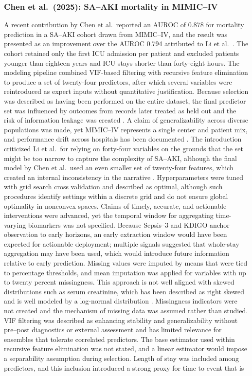\subsubsection{Chen et al.\ (2025): SA--AKI mortality in MIMIC--IV}
A recent contribution by Chen et al.\ reported an AUROC of 0.878 for mortality prediction in a SA--AKI cohort drawn from MIMIC--IV, and the result was presented as an improvement over the AUROC 0.794 attributed to Li et al.\ \citep{Chen_2025,Li_2023_SciRep}. The cohort retained only the first ICU admission per patient and excluded patients younger than eighteen years and ICU stays shorter than forty-eight hours. The modeling pipeline combined VIF-based filtering with recursive feature elimination to produce a set of twenty-four predictors, after which several variables were reintroduced as expert inputs without quantitative justification. Because selection was described as having been performed on the entire dataset, the final predictor set was influenced by outcomes from records later treated as held out and the risk of information leakage was created \citep{Kang_Yoon_2023}. A claim of generalizability across diverse populations was made, yet MIMIC--IV represents a single center and patient mix, and performance drift across hospitals has been documented \citep{Johnson_2023_MIMIC,Rockenschaub_2024}. The introduction criticized Li et al.\ for relying on forty-four variables on the grounds that the set might be too narrow to capture the complexity of SA--AKI, although the final model by Chen et al.\ used an even smaller set of twenty-four features, which created an internal inconsistency in the narrative \citep{Chen_2025,Li_2023_SciRep}. Hyperparameters were tuned with grid search cross validation and described as optimal, although such procedures identify settings within a discrete grid and do not ensure global optimality in nonconvex spaces. Claims of timely, accurate, and actionable interventions were advanced, yet the temporal window for aggregating time-varying biomarkers was not specified. Because Sepsis--3 and KDIGO anchor observation to early horizons, an early extraction window would have been expected for actionable deployment; multiple signals suggested that whole-stay aggregation may have been used, which would introduce future information relative to early prediction. Missing values were imputed by means that were tied to percentage thresholds, and mean imputation was applied for variables with up to twenty percent missingness. This approach is not well aligned with skewed distributions such as serum creatinine, which has been described as right skewed and is well modeled by a log-normal distribution \citep{Haeckel_2010}. Missingness indicators were not created and the mechanism of missing data was assumed rather than studied. VIF filtering was described as enhancing stability and generalizability without pre–post diagnostics or external assessment and has limited relevance for ensembles that tolerate correlated predictors. The base estimator used within recursive feature elimination was not stated, and a linear estimator would impose a separability assumption during selection. Length of stay was included among predictors, and this inclusion introduced a strong proxy for time to event that is 